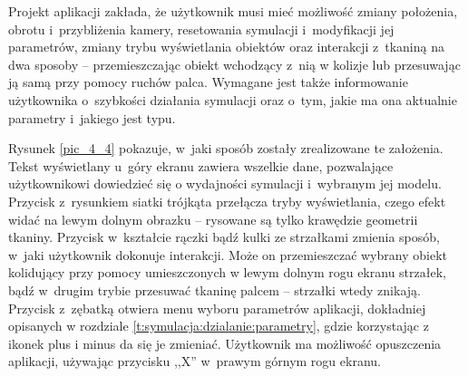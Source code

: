 		
		
		Projekt aplikacji zakłada, że użytkownik musi mieć możliwość zmiany położenia, obrotu i~przybliżenia kamery, resetowania symulacji i~modyfikacji jej parametrów, zmiany trybu wyświetlania obiektów oraz interakcji z~tkaniną na dwa sposoby -- przemieszczając obiekt wchodzący z~nią w kolizje lub przesuwając ją samą przy pomocy ruchów palca. Wymagane jest także informowanie użytkownika o~szybkości działania symulacji oraz o~tym, jakie ma ona aktualnie parametry i~jakiego jest typu.
		
		Rysunek \ref{pic_4_4} pokazuje, w~jaki sposób zostały zrealizowane te założenia. Tekst wyświetlany u~góry ekranu zawiera wszelkie dane, pozwalające użytkownikowi dowiedzieć się o wydajności symulacji i~wybranym jej modelu. Przycisk z~rysunkiem siatki trójkąta przełącza tryby wyświetlania, czego efekt widać na lewym dolnym obrazku -- rysowane są tylko krawędzie geometrii tkaniny. Przycisk w~kształcie rączki bądź kulki ze strzałkami zmienia sposób, w~jaki użytkownik dokonuje interakcji. Może on przemieszczać wybrany obiekt kolidujący przy pomocy umieszczonych w lewym dolnym rogu ekranu strzałek, bądź w~drugim trybie przesuwać tkaninę palcem -- strzałki wtedy znikają. Przycisk z~zębatką otwiera menu wyboru parametrów aplikacji, dokładniej opisanych w rozdziale \ref{t:symulacja:dzialanie:parametry}, gdzie korzystając z ikonek plus i minus da się je zmieniać. Użytkownik ma możliwość opuszczenia aplikacji, używając przycisku ,,X'' w~prawym górnym rogu ekranu.
